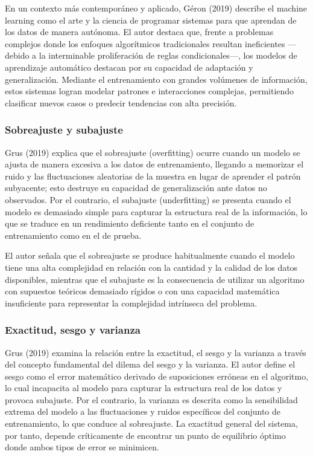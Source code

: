 \documentclass[11pt,oneside,openany]{book}
\begin{document}
En un contexto más contemporáneo y aplicado, Géron (2019) describe el machine learning como el arte y la ciencia de programar sistemas para que aprendan de los datos de manera autónoma. El autor destaca que, frente a problemas complejos donde los enfoques algorítmicos tradicionales resultan ineficientes ---debido a la interminable proliferación de reglas condicionales---, los modelos de aprendizaje automático destacan por su capacidad de adaptación y generalización. Mediante el entrenamiento con grandes volúmenes de información, estos sistemas logran modelar patrones e interacciones complejas, permitiendo clasificar nuevos casos o predecir tendencias con alta precisión.

\subsubsection*{Sobreajuste y subajuste}

Grus (2019) explica que el sobreajuste (overfitting) ocurre cuando un modelo se ajusta de manera excesiva a los datos de entrenamiento, llegando a memorizar el ruido y las fluctuaciones aleatorias de la muestra en lugar de aprender el patrón subyacente; esto destruye su capacidad de generalización ante datos no observados. Por el contrario, el subajuste (underfitting) se presenta cuando el modelo es demasiado simple para capturar la estructura real de la información, lo que se traduce en un rendimiento deficiente tanto en el conjunto de entrenamiento como en el de prueba.

El autor señala que el sobreajuste se produce habitualmente cuando el modelo tiene una alta complejidad en relación con la cantidad y la calidad de los datos disponibles, mientras que el subajuste es la consecuencia de utilizar un algoritmo con supuestos teóricos demasiado rígidos o con una capacidad matemática insuficiente para representar la complejidad intrínseca del problema.

\subsubsection*{Exactitud, sesgo y varianza}

Grus (2019) examina la relación entre la exactitud, el sesgo y la varianza a través del concepto fundamental del dilema del sesgo y la varianza. El autor define el sesgo como el error matemático derivado de suposiciones erróneas en el algoritmo, lo cual incapacita al modelo para capturar la estructura real de los datos y provoca subajuste. Por el contrario, la varianza es descrita como la sensibilidad extrema del modelo a las fluctuaciones y ruidos específicos del conjunto de entrenamiento, lo que conduce al sobreajuste. La exactitud general del sistema, por tanto, depende críticamente de encontrar un punto de equilibrio óptimo donde ambos tipos de error se minimicen.
\end{document}
